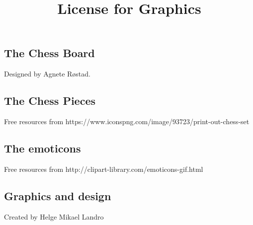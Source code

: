 \documentclass{article}
\title{License for Graphics}
\begin{document}
\date{}
\maketitle
{}

\subsection*{ The Chess Board }
\begin{description}
\item Designed by Agnete Røstad.
\end{description}

\subsection*{ The Chess Pieces }
\begin{description}
\item Free resources from https://www.iconspng.com/image/93723/print-out-chess-set
\end{description}

\subsection*{ The emoticons }
\begin{description}
\item Free resources from http://clipart-library.com/emoticons-gif.html
\end{description}

\subsection*{ Graphics and design }
\begin{description}
\item Created by Helge Mikael Landro
\end{description}
\end{document}
